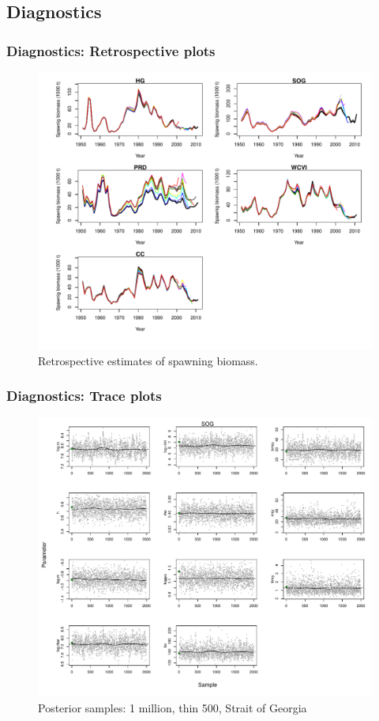 \subsection{Diagnostics} %
\label{sub:diagnostics}
%
\begin{frame}[t]\frametitle{Diagnostics: Retrospective plots}
	\begin{figure}[htbp]
		\centering
		\vspace{-.75cm}	\includegraphics[scale=0.45]{../FIGS/qPriorFigs/iscam_fig_sbt_retrospective}	
		\vspace{-1cm}
		\caption{Retrospective estimates of spawning biomass.}
	\end{figure}
\end{frame}
%
\begin{frame}[t]\frametitle{Diagnostics: Trace plots}
	\begin{figure}[htbp]
		\centering
		\vspace{-0.75cm}	\includegraphics[scale=0.35]{../FIGS/qPriorFigs/iscam_fig_trace_SOG}
		\vspace{-0.65cm}
		\caption{Posterior samples: 1 million, thin 500, Strait of Georgia}
	\end{figure}
	
\end{frame}
